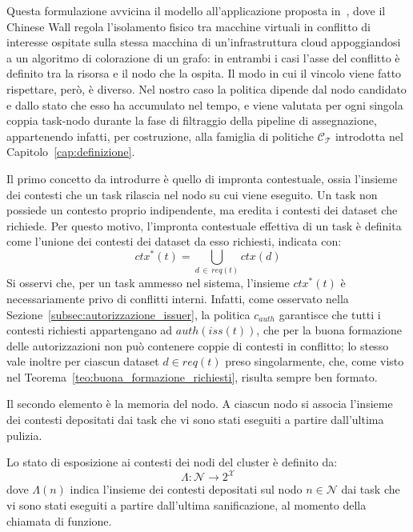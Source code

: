 Questa formulazione avvicina il modello all'applicazione proposta in~\cite{chinese-wall-cloud-nodes-data}, dove il Chinese Wall regola l'isolamento fisico tra macchine virtuali in conflitto di interesse ospitate sulla stessa macchina di un'infrastruttura cloud appoggiandosi a un algoritmo di colorazione di un grafo: in entrambi i casi l'asse del conflitto è definito tra la risorsa e il nodo che la ospita. Il modo in cui il vincolo viene fatto rispettare, però, è diverso. Nel nostro caso la politica dipende dal nodo candidato e dallo stato che esso ha accumulato nel tempo, e viene valutata per ogni singola coppia task-nodo durante la fase di filtraggio della pipeline di assegnazione, appartenendo infatti, per costruzione, alla famiglia di politiche $\mathcal{C_T}$ introdotta nel Capitolo~\ref{cap:definizione}.

Il primo concetto da introdurre è quello di impronta contestuale, ossia l'insieme dei contesti che un task rilascia nel nodo su cui viene eseguito. Un task non possiede un contesto proprio indipendente, ma eredita i contesti dei dataset che richiede. Per questo motivo, l'impronta contestuale effettiva di un task è definita come l'unione dei contesti dei dataset da esso richiesti, indicata con:
\begin{equation}
    ctx^*(t) = \bigcup_{d \,\in\, req(t)} ctx(d)
\end{equation}
Si osservi che, per un task ammesso nel sistema, l'insieme $ctx^*(t)$ è necessariamente privo di conflitti interni. Infatti, come osservato nella Sezione~\ref{subsec:autorizzazione_issuer}, la politica $c_{auth}$ garantisce che tutti i contesti richiesti appartengano ad $auth(iss(t))$, che per la buona formazione delle autorizzazioni non può contenere coppie di contesti in conflitto; lo stesso vale inoltre per ciascun dataset $d \in req(t)$ preso singolarmente, che, come visto nel Teorema~\ref{teo:buona_formazione_richiesti}, risulta sempre ben formato.

Il secondo elemento è la memoria del nodo. A ciascun nodo si associa l'insieme dei contesti depositati dai task che vi sono stati eseguiti a partire dall'ultima pulizia.

\begin{definition}
    \label{def:memoria_nodi}
    Lo stato di esposizione ai contesti dei nodi del cluster è definito da:
    \begin{equation}
        \Lambda: \mathcal{N} \rightarrow 2^{\mathcal{X}}
    \end{equation}
    dove $\Lambda(n)$ indica l'insieme dei contesti depositati sul nodo $n \in \mathcal{N}$ dai task che vi sono stati eseguiti a partire dall'ultima sanificazione, al momento della chiamata di funzione.
\end{definition}

